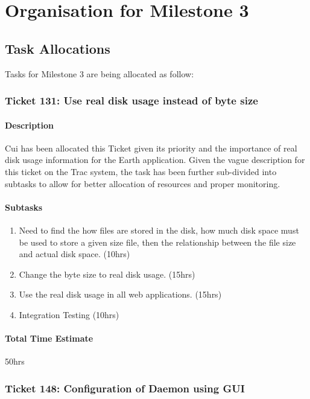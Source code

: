 \documentclass[10pt,a4,oneside]{article}
\begin{document}
\section{Organisation for Milestone 3}
 
\label{sec:g1org}

\subsection{Task Allocations}

Tasks for Milestone 3 are being allocated as follow:
 
\subsubsection{Ticket 131: Use real disk usage instead of byte size}

\paragraph{Description}
Cui has been allocated this Ticket given its priority and the 
importance of real disk usage information for the Earth application. 
Given the vague description for this ticket on the Trac system,
the task has been further sub-divided into subtasks to allow for
better allocation of resources and proper monitoring.

\paragraph{Subtasks}
\noindent
\begin{enumerate}
\item Need to find the how files are stored in the disk, how much 
disk space must be used to store a given size file, then the relationship 
between the file size and actual disk space. (10hrs)
\item Change the byte size to real disk usage. (15hrs)
\item Use the real disk usage in all web applications. (15hrs)
\item Integration Testing (10hrs)
\end{enumerate}

\paragraph{Total Time Estimate} 50hrs


\subsubsection{Ticket 148: Configuration of Daemon using GUI}
\end{document}
